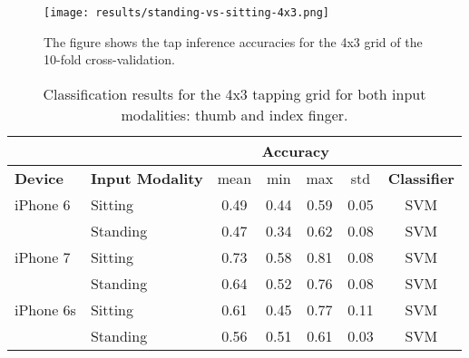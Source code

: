 \begin{appendix}
\begin{figure}[h!]
  \centering
  \texttt{[image: results/standing-vs-sitting-4x3.png]}
  \caption{The figure shows the tap inference accuracies for the 4x3 grid of the 10-fold cross-validation.} \label{fig:participation}
\end{figure}

\begin{table}[h!]
  \centering
\begin{tabular}{|l|l|c|c|c|c|c|}
  \cline{3-6}
  \multicolumn{2}{c}{} & \multicolumn{4}{|c|}{\textbf{Accuracy}}  \\
  \hline
  \textbf{Device} & \textbf{Input Modality} & mean &   min &   max  & std &  \textbf{Classifier} \\
  \hline
	iPhone 6 &  Sitting &      0.49 &     0.44 &     0.59 &     0.05 &  SVM \\
	{} & Standing &      0.47 &     0.34 &     0.62 &     0.08 &  SVM \\
	\hline
iPhone 7 &   Sitting     &      0.73 &     0.58 &     0.81 &     0.08 &  SVM \\
	& Standing &      0.64 &     0.52 &     0.76 &     0.08 &  SVM \\
	\hline
iPhone 6s & Sitting &      0.61 &     0.45 &     0.77 &     0.11 &  SVM \\
	& Standing &      0.56 &     0.51 &     0.61 &     0.03 &  SVM \\
	\hline
\end{tabular}
  \caption{Classification results for the 4x3 tapping grid for both input modalities: thumb and index finger.}
\end{table}

\end{appendix}

\endinput
